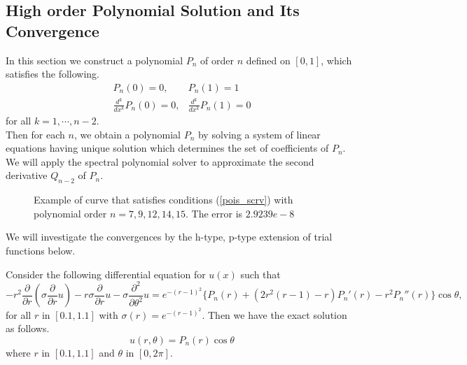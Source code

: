 
\subsection {High order Polynomial Solution and Its Convergence}

In this section we construct a polynomial $P_n$ of order $n$ defined on $[0,1]$, which satisfies the following.
\begin{eqnarray}
\label{pois_scrv}
    P_n(0) = 0, &P_n(1) = 1 \\
    \frac{d^k}{dx^k}P_n(0) = 0, &\frac{d^k}{dx^k}P_n(1) = 0
\end{eqnarray}
for all $k = 1, \cdots, n-2$. \\
Then for each $n$, we obtain a polynomial $P_n$ by solving a system of linear equations having unique solution which determines the set of coefficients of $P_n$. We will apply the spectral polynomial solver to approximate the second derivative $Q_{n-2}$ of $P_n$.

\begin{figure}[h]
    \begin{center}
    \caption{\label{scrvsol}Example of curve that satisfies conditions (\ref{pois_scrv}) with polynomial order $n=7, 9, 12, 14, 15$. The error is $2.9239e-8$}
    \end{center}
\end{figure}

We will investigate the convergences by the h-type, p-type extension of trial functions below.

\begin{problem}
Consider the following differential equation for $u(x)$ such that
\begin{equation}
\label{poi_poly}
-r^2 \frac{\partial}{\partial r} (\sigma \frac{\partial}{\partial r}u) - r \sigma \frac{\partial}{\partial r}u - \sigma \frac{\partial^2}{\partial \theta^2}u = e^{-(r-1)^2}\{P_n(r) + (2r^2(r-1)-r)P_n'(r) - r^2 P_n''(r)\} \cos \theta,
\end{equation}
for all $r$ in $[0.1, 1.1]$ with $\sigma(r) = e^{-(r-1)^2}$. Then we have the exact solution as follows.
\begin{equation}
u(r, \theta) = P_n(r) \cos \theta
\end{equation}
where $r$ in $[0.1, 1.1]$ and $\theta$ in $[0, 2\pi]$.
\end{problem}

